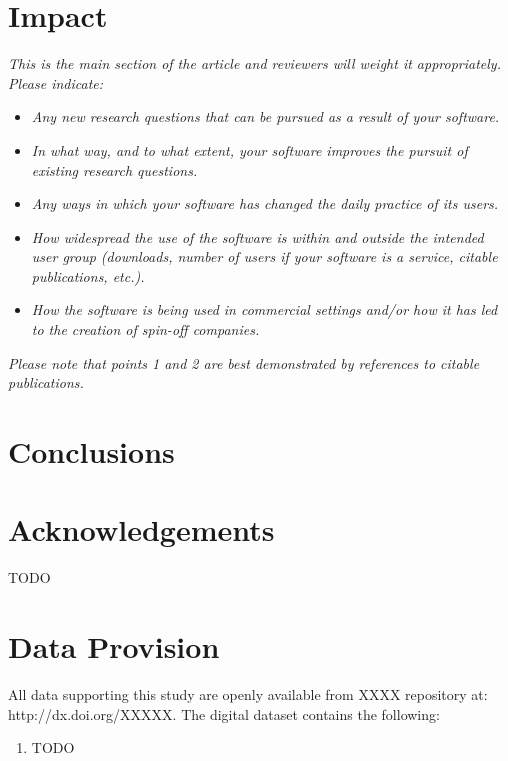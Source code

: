 \documentclass[11pt, a4paper, oneside, onecolumn]{article}
\begin{document}
\section{Impact}
\textit{This is the main section of the article and reviewers will weight it appropriately.
Please indicate:}
\begin{itemize}
    \item \textit{Any new research questions that can be pursued as a result of your software.}
    \item \textit{In what way, and to what extent, your software improves the pursuit of existing research questions.}
    \item \textit{Any ways in which your software has changed the daily practice of its users.}
    \item \textit{How widespread the use of the software is within and outside the intended user group (downloads, number of users if your software is a service, citable publications, etc.).}
    \item \textit{How the software is being used in commercial settings and/or how it has led to the creation of spin-off companies.}
    \end{itemize}
\textit{Please note that points 1 and 2 are best demonstrated by
  references to citable publications.}

\section{Conclusions}


\section*{Acknowledgements} \label{sec:acknowledgements}
TODO

\section*{Data Provision} \label{sec:dataProvision}
\noindent All data supporting this study are openly available from XXXX repository at: http://dx.doi.org/XXXXX. The digital dataset contains the following:

\begin{enumerate}
\item TODO
\end{enumerate}


 
\end{document}
